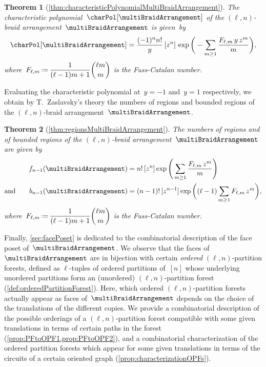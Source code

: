 \documentclass{amsart}
\newtheorem*{theorem*}{Theorem}
\theoremstyle{definition}
\newcommand{\eqdef}{\mbox{\,\raisebox{0.2ex}{\scriptsize\ensuremath{\mathrm:}}\ensuremath{=}\,}} %
\begin{document}
\begin{theorem*}[\cref{thm:characteristicPolynomialMultiBraidArrangement}]
The characteristic polynomial~$\charPol[\multiBraidArrangement]$ of the $(\ell,n)$-braid arrangement~$\multiBraidArrangement$ is given~by
\[
\charPol[\multiBraidArrangement] = \frac{(-1)^n n!}{y} \, [z^n] \, \exp \bigg( - \sum_{m \ge 1} \frac{F_{\ell,m} \, y \, z^m}{m} \bigg) ,
\]
where~$\displaystyle F_{\ell,m} \eqdef \frac{1}{(\ell-1)m+1} \binom{\ell m}{m}$ is the Fuss-Catalan number.
\end{theorem*}

Evaluating the characteristic polynomial at~$y = -1$ and~$y = 1$ respectively, we obtain by T.~Zaslavsky's theory the numbers of regions and bounded regions of the $(\ell,n)$-braid arrangement~$\multiBraidArrangement$.

\begin{theorem*}[\cref{thm:regionsMultiBraidArrangement}]
The numbers of regions and of bounded regions of the $(\ell,n)$-braid arrangement~$\multiBraidArrangement$ are given by
\begin{align*}
f_{n-1}(\multiBraidArrangement) 
& = n! \, [z^n] \exp \Bigg( \sum_{m \ge 1} \frac{F_{\ell,m} \, z^m}{m} \Bigg) \\
\text{and}\qquad
b_{n-1}(\multiBraidArrangement)
& = (n-1)! \, [z^{n-1}] \exp \bigg( (\ell-1) \sum_{m \ge 1} F_{\ell,m} \, z^m \bigg),
\end{align*}
where~$\displaystyle F_{\ell,m} \eqdef \frac{1}{(\ell-1)m+1} \binom{\ell m}{m}$ is the Fuss-Catalan number.
\end{theorem*}

Finally, \cref{sec:facePoset} is dedicated to the combinatorial description of the face poset of~$\multiBraidArrangement$.
We observe that the faces of~$\multiBraidArrangement$ are in bijection with certain \emph{ordered} $(\ell,n)$-partition forests, defined as $\ell$-tuples of ordered partitions of~$[n]$ whose underlying unordered partitions form an (unordered) $(\ell,n)$-partition forest (\cref{def:orderedPartitionForest}).
Here, which ordered $(\ell,n)$-partition forests actually appear as faces of~$\multiBraidArrangement$ depends on the choice of the translations of the different copies.
We provide a combinatorial description of the possible orderings of a $(\ell,n)$-partition forest compatible with some given translations in terms of certain paths in the forest (\cref{prop:PFtoOPF1,prop:PFtoOPF2}), and a combinatorial characterization of the ordered partition forests which appear for some given translations in terms of the circuits of a certain oriented graph (\cref{prop:characterizationOPFs}).
\end{document}
